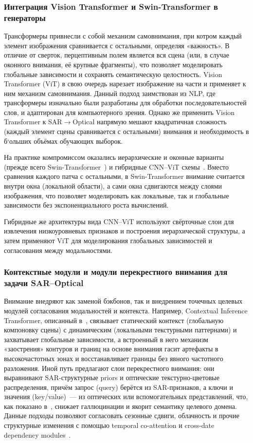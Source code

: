 \subsubsection{Интеграция Vision Transformer и Swin-Transformer в генераторы}
Трансформеры привнесли с собой механизм самовнимания, при котром каждый элемент изображения сравнивается с остальными, определяя «важность». В отличие от сверток, перцептивным полем является вся сцена (или, в случае оконного внимания, её крупные фрагменты), что позволяет моделировать глобальные зависимости и сохранять семантическую целостность.
Vision Transformer (ViT) в свою очередь нарезает изображение на части и применяет к ним механизм самовнимания.
Данный подход заимствован из NLP, где трансформеры изначально были разработаны для обработки последовательностей слов, и адаптирован для компьютерного зрения. 
Однако же применить Vision Transformer к SAR$\to$Optical напрямую мешают квадратичная сложность (каждый элемент сцены сравнивается с остальными) внимания и необходимость в б`ольших объёмах обучающих выборок.

На практике компромиссом оказались иерархические и оконные варианты (прежде всего Swin-Transformer~\cite{kong2022multi}) и гибридные CNN--ViT схемы~\cite{wang2025generative}.
Вместо сравнения каждого патча с остальными, в Swin-Transformer внимание считается внутри окна (локальной области), а сами окна сдвигаются между слоями изображения, что позволяет моделировать как локальные, так и глобальные зависимости без экспоненциального роста вычислений.

Гибридные же архитектуры вида CNN--ViT используют свёрточные слои для извлечения низкоуровневых признаков и построения иерархической структуры, а затем применяют ViT для моделирования глобальных зависимостей и согласования между модальностями.

\subsubsection{Контекстные модули и модули перекрестного внимания для задачи SAR--Optical}
Внимание внедряют как заменой бэкбонов, так и внедрением точечных целевых модулей согласования модальностей и контекста.
Например, Contextual Inference Transformer, описанный в~\cite{luo2024contextual}, связывает статический контекст (глобальную компоновку сцены) с динамическим (локальными текстурными паттернами) и захватывает глобальные зависимости, а встроенный в него механизм «заострения» контуров и границ на основе внимания гасит артефакты в высокочастотных зонах и восстанавливает границы без явного частотного разложения.
Иной путь предлагают слои перекрестного внимания: они выравнивают SAR-структурные priors и оптические текстурно-цветовые распределения, причём запрос (query) берётся из SAR-признаков, а ключи и значения (key/value)~--- из оптических или вспомогательных представлений, что, как показано в~\cite{wang2025generative, zhao2025hvt}, снижает галлюцинации и якорит семантику целевого домена.
Данные подходы позволяют согласовать сезонные сдвиги, облачность и прочие структурные изменения с помощью temporal co-attention и cross-date dependency modules~\cite{kwak2024assessing, liu2022modality}.

